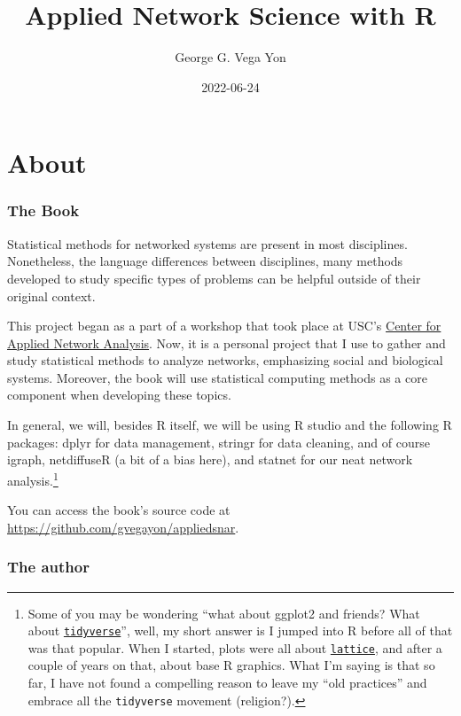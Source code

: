 \documentclass[]{book}
\title{Applied Network Science with R}
\author{George G. Vega Yon}
\date{2022-06-24}
\begin{document}
\maketitle

{
\setcounter{tocdepth}{1}
\tableofcontents
}
\hypertarget{about}{%
\chapter{About}\label{about}}

\renewcommand{\Pr}[1]{\mbox{Pr}\left(#1\right)}
\renewcommand{\exp}[1]{\mbox{exp}\left\{#1\right\}}

\hypertarget{the-book}{%
\subsection{The Book}\label{the-book}}

Statistical methods for networked systems are present in most disciplines.
Nonetheless, the language differences between disciplines, many methods
developed to study specific types of problems can be helpful outside of their original context.

This project began as a part of a workshop that took place at USC's
\href{https://cana.usc.edu}{Center for Applied Network Analysis}. Now, it is a personal
project that I use to gather and study statistical methods to analyze networks, emphasizing social and biological systems.
Moreover, the book will use statistical computing methods as a core component
when developing these topics.

In general, we will, besides R itself, we will be using R studio and the following
R packages: dplyr for data management, stringr for data cleaning, and of course
igraph, netdiffuseR (a bit of a bias here), and statnet for our neat network
analysis.\footnote{Some of you may be wondering ``what about ggplot2 and friends? What about \href{https://www.tidyverse.org/}{\texttt{tidyverse}}'', well, my short answer is I jumped into R before all of that was that popular. When I started, plots were all about \href{https://CRAN.R-project.org/package=lattice}{\texttt{lattice}}, and after a couple of years on that, about base R graphics. What I'm saying is that so far, I have not found a compelling reason to leave my ``old practices'' and embrace all the \texttt{tidyverse} movement (religion?).}

You can access the book's source code at \url{https://github.com/gvegayon/appliedsnar}.

\hypertarget{the-author}{%
\subsection{The author}\label{the-author}}
\end{document}
